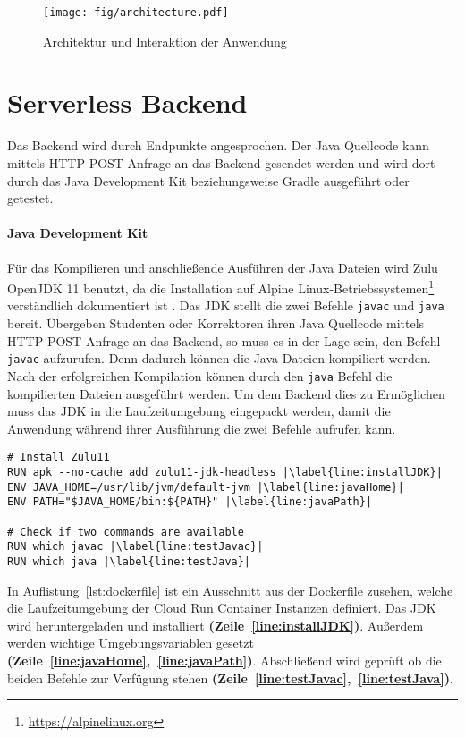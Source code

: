 \begin{figure}
  \centering
  \texttt{[image: fig/architecture.pdf]}
  \caption{Architektur und Interaktion der Anwendung}
  \label{fig:architecture}
\end{figure}

\section{Serverless Backend}
Das Backend wird durch Endpunkte angesprochen.
Der Java Quellcode kann mittels HTTP-POST Anfrage an das
Backend gesendet werden und wird dort durch das Java Development Kit
beziehungsweise Gradle ausgeführt oder getestet.


\paragraph{Java Development Kit} Für das Kompilieren und
anschließende Ausführen der Java Dateien wird
Zulu OpenJDK 11 benutzt, da die Installation auf
Alpine Linux-Betriebssystemen\footnote{\url{https://alpinelinux.org}}
verständlich dokumentiert ist \cite{AzulZuluJDK}.
Das JDK stellt die zwei Befehle \texttt{javac} und \texttt{java} bereit.
Übergeben Studenten oder Korrektoren ihren Java Quellcode mittels HTTP-POST Anfrage an
das Backend, so muss es in der Lage sein, den Befehl \texttt{javac}
aufzurufen. Denn dadurch können die Java Dateien kompiliert werden.
Nach der erfolgreichen Kompilation können durch den \texttt{java} Befehl die kompilierten Dateien
ausgeführt werden. Um dem Backend dies zu Ermöglichen muss das JDK in die Laufzeitumgebung eingepackt
werden, damit die Anwendung während ihrer Ausführung die zwei Befehle aufrufen kann.\\

\begin{lstlisting}[caption={Ausschnitt aus der Dockerfile. Herunterladen und Einrichten des JDK.}, label={lst:dockerfile}, escapechar=|]
# Install Zulu11
RUN apk --no-cache add zulu11-jdk-headless |\label{line:installJDK}|
ENV JAVA_HOME=/usr/lib/jvm/default-jvm |\label{line:javaHome}|
ENV PATH="$JAVA_HOME/bin:${PATH}" |\label{line:javaPath}|

# Check if two commands are available
RUN which javac |\label{line:testJavac}|
RUN which java |\label{line:testJava}|
\end{lstlisting}

In Auflistung~\ref{lst:dockerfile} ist ein Ausschnitt
aus der Dockerfile zusehen, welche die Laufzeitumgebung
der Cloud Run Container Instanzen definiert. Das JDK wird
heruntergeladen und installiert \textbf{(Zeile~\ref{line:installJDK})}.
Außerdem werden wichtige Umgebungsvariablen
gesetzt \textbf{(Zeile~\ref{line:javaHome},~\ref{line:javaPath})}.
Abschließend wird geprüft ob die beiden Befehle
zur Verfügung stehen \textbf{(Zeile~\ref{line:testJavac},~\ref{line:testJava})}.

